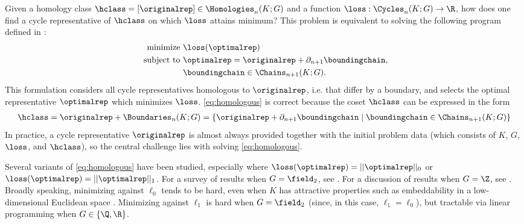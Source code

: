 Given a homology class $\hclass =[\originalrep] \in \Homologies_n(K; G)$ and a function $\loss: \Cycles_n(K;G) \to \R$, how does one find a cycle representative of $\hclass$ on which $\loss$ attains minimum?  This problem is equivalent to  solving the following program defined in \cite{dey2011optimal}:
\begin{align}
   \begin{split}
    \text{minimize } & \loss(\optimalrep) \\
    \text{ subject to } & \optimalrep = \originalrep + \partial_{n+1} \boundingchain, \\
    & \boundingchain \in \Chains_{n+1}(K; G).
   \end{split}
   \label{eq:homologous}
\end{align}
This formulation considers all cycle representatives homologous to $\originalrep$, i.e. that differ by a boundary, and selects the optimal representative $\optimalrep$ which minimizes $\loss$.
\pr \eqref{eq:homologous} is correct because the coset $\hclass$ can be expressed in the form
%
    \begin{align*}
    \hclass
    =
    \originalrep + \Boundaries_n(K; G) 
    =
    \{ \originalrep + \partial_{n+1} \boundingchain \mid \boundingchain \in \Chains_{n+1}(K; G) \}
    \end{align*}  
%
In practice, a cycle representative $\originalrep$ is almost always provided together with the initial problem data (which consists of $K$, $G$, $\loss$, and $\hclass$), so the central challenge lies with solving \pr \eqref{eq:homologous}.

Several variants of \pr \eqref{eq:homologous} have been studied, especially where $\loss(\optimalrep) = ||\optimalrep||_0$ or $\loss(\optimalrep) = ||\optimalrep||_1$.  For a survey of results when $G = \field_2$, see \cite{chenhardness}.  For a discussion of results when $G = \Z$, see \cite{dey2011optimal}.  Broadly  speaking, minimizing against $\ell_0$  tends to be hard, even when $K$ has attractive properties such as embeddability in a low-dimensional Euclidean space \cite{borradaile2020minimum}.  Minimizing against $\ell_1$  is hard when $G = \field_2$ (since, in this case, $\ell_1 = \ell_0$),  but tractable via linear programming when $G \in \{\Q, \R\}$.  


